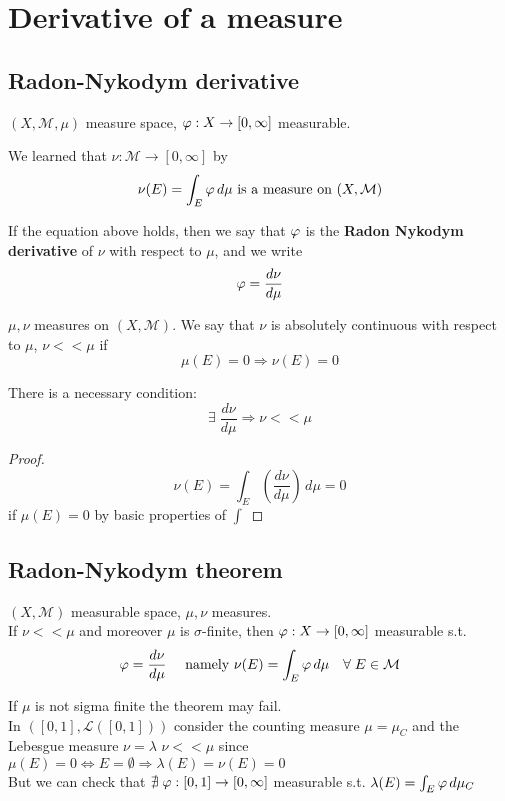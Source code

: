 \section{Derivative of a measure}
\subsection{Radon-Nykodym derivative}
\(\left(X, \mathcal{M}, \mu \right)\) measure space,
\(\oldphi : X \to \left[0, \infty \right]\) measurable.  

We learned that \(\nu: \mathcal{M} \to \left[0, \infty \right]\) by 
\[
    \nu(E)= \int_E \oldphi \, d\mu \mbox{ is a measure on }(X, \mathcal{M})
\] 

If the equation above holds, then we say that \(\oldphi\) is the \textbf{Radon Nykodym derivative} of \(\nu\) with respect to \(\mu\), and we write 
\[
    \oldphi = \frac{d\nu}{d\mu}
\]
\begin{definition}
    \(\mu, \nu  \) measures on \(\left(X, \mathcal{M}\right)\). 
    We say that \(\nu\) is absolutely continuous with respect to \(\mu\), \(\nu << \mu \) if 
    \[
        \mu(E) = 0 \Rightarrow \nu(E)=0
    \]
\end{definition}

\begin{lemma}
    There is a necessary condition:
    \[ 
        \exists \; \frac{d \nu}{d \mu} \Rightarrow \nu << \mu 
    \]
\end{lemma}

\begin{proof}
    \[
        \nu(E) = \int_E \left(\frac{d\nu}{d\mu}\right) \, d\mu = 0
    \] 
    if \(\mu(E)=0\) by basic properties of \(\int\)
\end{proof}
\subsection{Radon-Nykodym theorem}
\begin{theorem}
    \(\left(X, \mathcal{M}\right) \) measurable space, \(\mu, \nu\) measures. \\
    If \(\nu << \mu \) and moreover \(\mu \) is \(\sigma\)-finite, then \(\oldphi : X \to \left[0, \infty\right]\) measurable s.t.
    \[
        \oldphi = \frac{d \nu}{d \mu} \quad  \text{ namely } \nu(E)= \int_E \oldphi \, d\mu \quad \forall \; E \in \mathcal{M}
    \]
\end{theorem}

\begin{remark}
    If \(\mu\) is not sigma finite the theorem may fail. \\
    In \(\left(\left[0, 1\right], \mathcal{L}\left(\left[0, 1\right]\right)\right)\) consider the counting measure \(\mu = \mu_C\) and the Lebesgue measure \(\nu= \lambda\)
    \(\nu << \mu\) since \(\mu(E)= 0 \Leftrightarrow E= \emptyset \Rightarrow \lambda(E) = \nu(E)=0\) \\
    But we can check that \( \nexists \; \oldphi : \left[0, 1\right] \rightarrow \left[0, \infty \right]\) measurable s.t. \(\lambda(E)= \int_E \oldphi \, d\mu_C\)
\end{remark}

